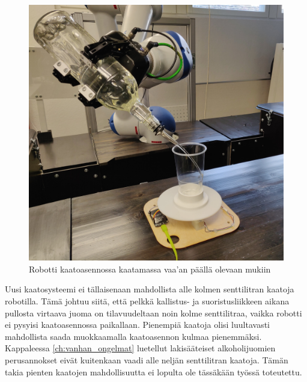 \begin{figure}[h]
\begin{center}
\includegraphics[scale=0.1]{img/kaato.jpg}
\end{center}
\caption{Robotti kaatoasennossa kaatamassa vaa'an päällä olevaan mukiin}
\label{fig:kaato}
\end{figure}

Uusi kaatosysteemi ei tällaisenaan mahdollista alle kolmen senttilitran kaatoja robotilla. Tämä johtuu siitä, että pelkkä kallistus- ja suoristusliikkeen aikana pullosta virtaava juoma on tilavuudeltaan noin kolme senttilitraa, vaikka robotti ei pysyisi kaatoasennossa paikallaan. Pienempiä kaatoja olisi luultavasti mahdollista saada muokkaamalla kaatoasennon kulmaa pienemmäksi. Kappaleessa \ref{ch:vanhan_ongelmat} luetellut lakisääteiset alkoholijuomien perusannokset eivät kuitenkaan vaadi alle neljän senttilitran kaatoja. Tämän takia pienten kaatojen mahdollisuutta ei lopulta ole tässäkään työssä toteutettu.
